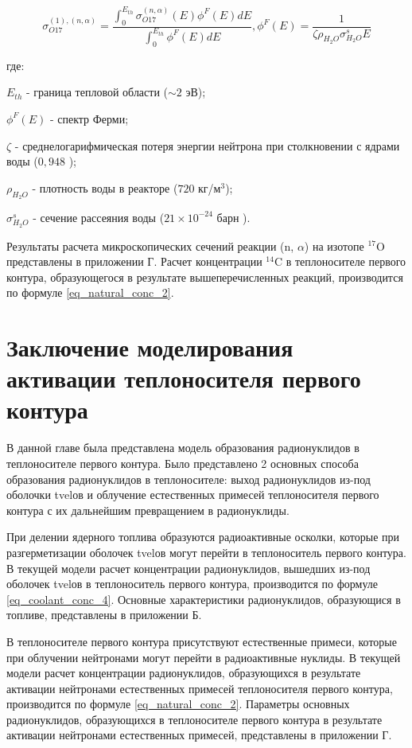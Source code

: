 \begin{equation}
    \label{eq_fermi}
    \sigma_{O17}^{(1), (n, \alpha)} = \frac
        {\int_{0}^{E_{th}} \sigma_{O17}^{(n, \alpha)}(E) \phi^{F}(E) dE}
        {\int_{0}^{E_{th}} \phi^{F}(E) dE}, \phi^{F}(E) = \frac{1}{\zeta \rho_{H_2O} \sigma_{H_2O}^s E}
\end{equation}

где:
\begin{description}
    \item $E_{th}$ - граница тепловой области ($\sim 2$ эВ);
    \item $\phi^F(E)$ - спектр Ферми;
    \item $\zeta$ - среднелогарифмическая потеря энергии нейтрона при столкновении с ядрами воды ($0,948$ 
        \cite{savander_part1});
    \item $\rho_{H_2O}$ - плотность воды в реакторе ($720$ кг/м$^{3}$);
    \item $\sigma_{H_2O}^s$ - сечение рассеяния воды ($21 \times 10^{-24}$ барн \cite{janis}).
\end{description}

Результаты расчета микроскопических сечений реакции (n, $\alpha$) на изотопе $^{17}\text{O}$ представлены в приложении 
Г. Расчет концентрации $^{14}\text{C}$ в теплоносителе первого контура, образующегося в результате вышеперечисленных 
реакций, производится по формуле \ref{eq_natural_conc_2}.

\section{Заключение моделирования активации теплоносителя первого контура}

В данной главе была представлена модель образования радионуклидов в теплоносителе первого контура. Было представлено 2 
основных способа образования радионуклидов в теплоносителе: выход радионуклидов из-под оболочки \ac{tvel}ов и облучение 
естественных примесей теплоносителя первого контура с их дальнейшим превращением в радионуклиды.

При делении ядерного топлива образуются радиоактивные осколки, которые при разгерметизации оболочек \ac{tvel}ов могут 
перейти в теплоноситель первого контура. В текущей модели расчет концентрации радионуклидов, вышедших из-под оболочек 
\ac{tvel}ов в теплоноситель первого контура, производится по формуле \ref{eq_coolant_conc_4}. Основные характеристики 
радионуклидов, образующися в топливе, представлены в приложении Б.

В теплоносителе первого контура присутствуют естественные примеси, которые при облучении нейтронами могут перейти в 
радиоактивные нуклиды. В текущей модели расчет концентрации радионуклидов, образующихся в результате активации 
нейтронами естественных примесей теплоносителя первого контура, производится по формуле \ref{eq_natural_conc_2}. 
Параметры основных радионуклидов, образующихся в теплоносителе первого контура в результате активации нейтронами 
естественных примесей, представлены в приложении Г.


